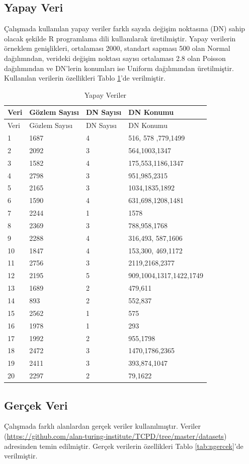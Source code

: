 \documentclass[12pt,twoside]{deuthesis}
\begin{document}
\hypertarget{yapay-veri}{%
\subsection{Yapay Veri}\label{yapay-veri}}

Çalışmada kullanılan yapay veriler farklı sayıda değişim noktasına (DN) sahip olacak şekilde R programlama dili kullanılarak üretilmiştir. Yapay verilerin örneklem genişlikleri, ortalaması 2000, standart sapması 500 olan Normal dağılımndan, verideki değişim noktası sayısı ortalaması 2.8 olan Poisson dağılımından ve DN'lerin konumları ise Uniform dağılımından üretilmiştir. Kullanılan verilerin özellikleri Tablo \ref{tab:nvar1}'de verilmiştir.

\begin{longtable}[]{@{}llll@{}}
\caption{\label{tab:nvar1} Yapay Veriler}\tabularnewline
\toprule
Veri & Gözlem Sayısı & DN Sayısı & DN Konumu\tabularnewline
\midrule
\endfirsthead
\toprule
Veri & Gözlem Sayısı & DN Sayısı & DN Konumu\tabularnewline
\midrule
\endhead
1 & 1687 & 4 & 516, 578 ,779,1499\tabularnewline
2 & 2092 & 3 & 564,1003,1347\tabularnewline
3 & 1582 & 4 & 175,553,1186,1347\tabularnewline
4 & 2798 & 3 & 951,985,2315\tabularnewline
5 & 2165 & 3 & 1034,1835,1892\tabularnewline
6 & 1590 & 4 & 631,698,1208,1481\tabularnewline
7 & 2244 & 1 & 1578\tabularnewline
8 & 2369 & 3 & 788,958,1768\tabularnewline
9 & 2288 & 4 & 316,493, 587,1606\tabularnewline
10 & 1847 & 4 & 153,300, 469,1172\tabularnewline
11 & 2756 & 3 & 2119,2168,2377\tabularnewline
12 & 2195 & 5 & 909,1004,1317,1422,1749\tabularnewline
13 & 1689 & 2 & 479,611\tabularnewline
14 & 893 & 2 & 552,837\tabularnewline
15 & 2562 & 1 & 575\tabularnewline
16 & 1978 & 1 & 293\tabularnewline
17 & 1992 & 2 & 955,1798\tabularnewline
18 & 2472 & 3 & 1470,1786,2365\tabularnewline
19 & 2411 & 3 & 393,874,1047\tabularnewline
20 & 2297 & 2 & 79,1622\tabularnewline
\bottomrule
\end{longtable}

\hypertarget{geruxe7ek-veri}{%
\subsection{Gerçek Veri}\label{geruxe7ek-veri}}

Çalışmada farklı alanlardan gerçek veriler kullanılmıştır. Veriler (\url{https://github.com/alan-turing-institute/TCPD/tree/master/datasets}) adresinden temin edilmiştir. Gerçek verilerin özellikleri Tablo \ref{tab:ngercek}'de verilmiştir.
\end{document}
